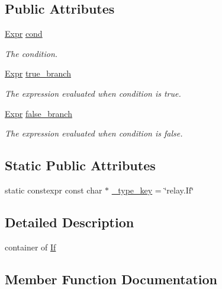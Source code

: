 \subsection*{Public Attributes}
\begin{DoxyCompactItemize}
\item 
\hyperlink{namespacetvm_1_1relay_a5b84e3790f89bb3fad5c7911eeb99531}{Expr} \hyperlink{classtvm_1_1relay_1_1IfNode_a8cd1fc508da901b65c306cb4e76b0643}{cond}
\begin{DoxyCompactList}\small\item\em The condition. \end{DoxyCompactList}\item 
\hyperlink{namespacetvm_1_1relay_a5b84e3790f89bb3fad5c7911eeb99531}{Expr} \hyperlink{classtvm_1_1relay_1_1IfNode_abbda9637de8fac5d227ef7c305e5f34e}{true\+\_\+branch}
\begin{DoxyCompactList}\small\item\em The expression evaluated when condition is true. \end{DoxyCompactList}\item 
\hyperlink{namespacetvm_1_1relay_a5b84e3790f89bb3fad5c7911eeb99531}{Expr} \hyperlink{classtvm_1_1relay_1_1IfNode_ae6a504717890d97b574b93dba29e2641}{false\+\_\+branch}
\begin{DoxyCompactList}\small\item\em The expression evaluated when condition is false. \end{DoxyCompactList}\end{DoxyCompactItemize}
\subsection*{Static Public Attributes}
\begin{DoxyCompactItemize}
\item 
static constexpr const char $\ast$ \hyperlink{classtvm_1_1relay_1_1IfNode_a5eeddf957ee2aef1ef5cd2a7c9cafea3}{\+\_\+type\+\_\+key} = \char`\"{}relay.\+If\char`\"{}
\end{DoxyCompactItemize}


\subsection{Detailed Description}
container of \hyperlink{classtvm_1_1relay_1_1If}{If} 

\subsection{Member Function Documentation}
